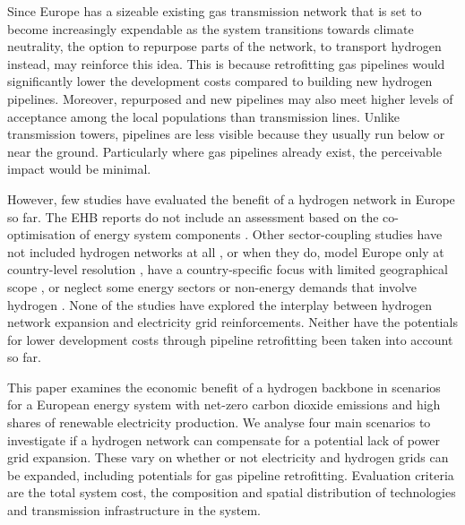 
Since Europe has a sizeable existing gas transmission network that is set to
become increasingly expendable as the system transitions towards climate
neutrality, the option to repurpose parts of the network, to transport hydrogen
instead, may reinforce this idea. This is because retrofitting gas pipelines
would significantly lower the development costs compared to building new
hydrogen pipelines. Moreover, repurposed and new pipelines may also meet higher
levels of acceptance among the local populations than transmission lines. Unlike
transmission towers, pipelines are less visible because they usually run below
or near the ground. Particularly where gas pipelines already exist, the
perceivable impact would be minimal.


However, few studies have evaluated the benefit of a hydrogen network in Europe
so far. The EHB reports do not include an assessment based on the
co-optimisation of energy system components
\cite{gasforclimateEuropeanHydrogen2020,gasforclimateEuropeanHydrogen2021,gasforclimateExtendingEuropean2021,gasforclimateEuropeanHydrogen2022}.
Other sector-coupling studies have not included hydrogen networks at all
\cite{brownSynergiesSector2018}, or when they do, model Europe only at
country-level resolution
\cite{europeancommission.directorategeneralforenergy.METISStudy2021,victoriaSpeedTechnological2021},
have a country-specific focus with limited geographical scope
\cite{gilsInteractionHydrogen2021}, or neglect some energy sectors or non-energy
demands that involve hydrogen
\cite{gilsInteractionHydrogen2021,Caglayan2019,caglayanRobustDesign2021}. None
of the studies have explored the interplay between hydrogen network expansion
and electricity grid reinforcements. Neither have the potentials for lower
development costs through pipeline retrofitting been taken into account so far.



This paper examines the economic benefit of a hydrogen backbone in scenarios for
a European energy system with net-zero carbon dioxide emissions and high shares
of renewable electricity production. We analyse four main scenarios to
investigate if a hydrogen network can compensate for a potential lack of power
grid expansion. These vary on whether or not electricity and hydrogen grids can
be expanded, including potentials for gas pipeline retrofitting. Evaluation
criteria are the total system cost, the composition and spatial distribution of
technologies and transmission infrastructure in the system.

